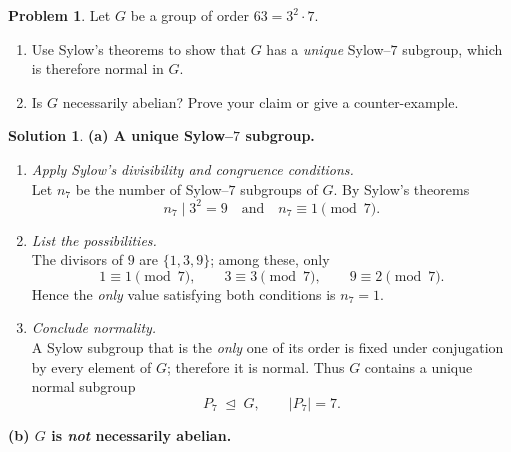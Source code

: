 \documentclass[12pt]{article}
\title{}
\author{Jerich Lee}
\date{\today}
\theoremstyle{definition} %
\newtheorem{solution}{Solution}
\newtheorem{problem}{Problem}
\theoremstyle{plain} %
\begin{document}
\maketitle
\begin{problem}
  Let $G$ be a group of order $63 = 3^{2}\cdot7$.
  \begin{enumerate}[]
      \item Use Sylow’s theorems to show that $G$ has a \emph{unique} Sylow–$7$ subgroup, which is therefore normal in $G$.
      \item Is $G$ necessarily abelian?  Prove your claim or give a counter-example.
  \end{enumerate}
  \end{problem}
  
  \begin{solution}
  \textbf{(a) A unique Sylow--$7$ subgroup.}
  
  \begin{enumerate}[]
      \item \emph{Apply Sylow’s divisibility and congruence conditions.}\\
            Let $n_{7}$ be the number of Sylow--$7$ subgroups of $G$.  
            By Sylow’s theorems
            \[
                n_{7}\mid 3^{2}=9
                \quad\text{and}\quad 
                n_{7}\equiv 1 \pmod{7}.
            \]
      \item \emph{List the possibilities.}\\
            The divisors of $9$ are $\{1,3,9\}$; among these, only
            \[
                1\equiv 1\pmod{7},\qquad
                3\equiv 3\pmod{7},\qquad
                9\equiv 2\pmod{7}.
            \]
            Hence the \emph{only} value satisfying both conditions is $n_{7}=1$.
      \item \emph{Conclude normality.}\\
            A Sylow subgroup that is the \emph{only} one of its order is fixed under conjugation by every element of $G$; therefore it is normal.  Thus $G$ contains a unique normal subgroup
            \[
                P_{7}\;\trianglelefteq\;G,
                \qquad |P_{7}|=7.
            \]
  \end{enumerate}
  
  \bigskip
  \textbf{(b)  $G$ is \emph{not} necessarily abelian.}
  

\end{solution}
\end{document}
